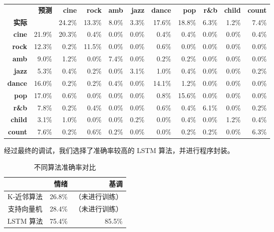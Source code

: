 \documentclass[a4paper,utf8,10pt]{article}
\begin{document}
\begin{center}
 \label{tab:genrecm}
\begin{tabular}{ | r r | r | r | r | r | r | r | r | r | r | }
\hline
 & \bf 预测 & \bf cine & \bf rock & \bf amb & \bf jazz & \bf dance & \bf pop & \bf r\&b & \bf child & \bf count \\
\bf 实际 & & 24.2\% & 13.3\% & 8.0\% & 3.3\% & 17.6\% & 18.8\% & 6.3\% & 1.2\% & 7.4\% \\\hline
\bf cine & 21.9\% & 20.3\% & 0.4\% & 0.0\% & 0.0\% & 0.4\% & 0.4\% & 0.0\% & 0.0\% & 0.4\% \\\hline
\bf rock & 12.3\% & 0.2\% & 11.5\% & 0.0\% & 0.0\% & 0.6\% & 0.0\% & 0.0\% & 0.0\% & 0.0\% \\\hline
\bf amb & 9.0\% & 1.2\% & 0.0\% & 7.4\% & 0.0\% & 0.2\% & 0.2\% & 0.0\% & 0.0\% & 0.0\% \\\hline
\bf jazz & 5.3\% & 0.4\% & 0.2\% & 0.0\% & 3.1\% & 1.0\% & 0.4\% & 0.0\% & 0.0\% & 0.2\% \\\hline
\bf dance & 16.0\% & 0.2\% & 0.2\% & 0.4\% & 0.0\% & 14.1\% & 1.2\% & 0.0\% & 0.0\% & 0.0\% \\\hline
\bf pop & 17.0\% & 0.6\% & 0.0\% & 0.0\% & 0.0\% & 0.8\% & 15.6\% & 0.0\% & 0.0\% & 0.0\% \\\hline
\bf r\&b & 7.8\% & 0.2\% & 0.4\% & 0.0\% & 0.0\% & 0.6\% & 0.4\% & 6.1\% & 0.0\% & 0.2\% \\\hline
\bf child & 3.1\% & 1.0\% & 0.0\% & 0.0\% & 0.2\% & 0.0\% & 0.4\% & 0.0\% & 1.2\% & 0.4\% \\\hline
\bf count & 7.6\% & 0.2\% & 0.6\% & 0.2\% & 0.0\% & 0.0\% & 0.2\% & 0.2\% & 0.0\% & 6.3\% \\\hline
\end{tabular}

\end{center}

经过最终的调试，我们选择了准确率较高的 LSTM 算法，并进行程序封装。

\begin{wraptable}{R}{6cm}
\vspace{-50pt}
\caption{不同算法准确率对比} \label{tab:acc}
\begin{tabular}{ c | r | r }
\hline
           &   情绪 &           基调 \\ \hline
K-近邻算法 & 26.8\% & （未进行训练） \\ \hline
支持向量机 & 28.4\% & （未进行训练） \\ \hline
 LSTM 算法 & 75.4\% &         85.5\% \\ \hline
\end{tabular}
\vspace{-10pt}
\end{wraptable}
\end{document}

